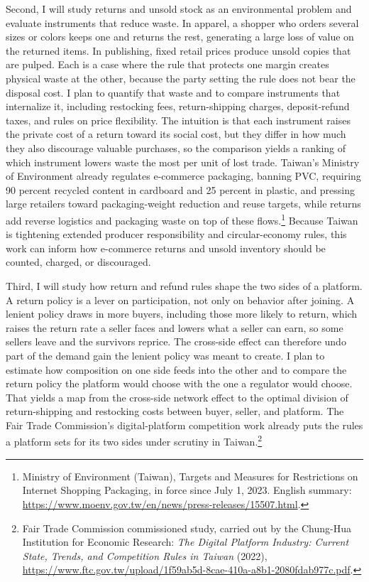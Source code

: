 \documentclass[11pt,letterpaper]{article}
\begin{document}
Second, I will study returns and unsold stock as an environmental problem and evaluate instruments that reduce waste. In apparel, a shopper who orders several sizes or colors keeps one and returns the rest, generating a large loss of value on the returned items. In publishing, fixed retail prices produce unsold copies that are pulped. Each is a case where the rule that protects one margin creates physical waste at the other, because the party setting the rule does not bear the disposal cost. I plan to quantify that waste and to compare instruments that internalize it, including restocking fees, return-shipping charges, deposit-refund taxes, and rules on price flexibility. The intuition is that each instrument raises the private cost of a return toward its social cost, but they differ in how much they also discourage valuable purchases, so the comparison yields a ranking of which instrument lowers waste the most per unit of lost trade. Taiwan's Ministry of Environment already regulates e-commerce packaging, banning PVC, requiring 90 percent recycled content in cardboard and 25 percent in plastic, and pressing large retailers toward packaging-weight reduction and reuse targets, while returns add reverse logistics and packaging waste on top of these flows.\footnote{Ministry of Environment (Taiwan), Targets and Measures for Restrictions on Internet Shopping Packaging, in force since July 1, 2023. English summary: \url{https://www.moenv.gov.tw/en/news/press-releases/15507.html}.} Because Taiwan is tightening extended producer responsibility and circular-economy rules, this work can inform how e-commerce returns and unsold inventory should be counted, charged, or discouraged.

Third, I will study how return and refund rules shape the two sides of a platform. A return policy is a lever on participation, not only on behavior after joining. A lenient policy draws in more buyers, including those more likely to return, which raises the return rate a seller faces and lowers what a seller can earn, so some sellers leave and the survivors reprice. The cross-side effect can therefore undo part of the demand gain the lenient policy was meant to create. I plan to estimate how composition on one side feeds into the other and to compare the return policy the platform would choose with the one a regulator would choose. That yields a map from the cross-side network effect to the optimal division of return-shipping and restocking costs between buyer, seller, and platform. The Fair Trade Commission's digital-platform competition work already puts the rules a platform sets for its two sides under scrutiny in Taiwan.\footnote{Fair Trade Commission commissioned study, carried out by the Chung-Hua Institution for Economic Research: \emph{The Digital Platform Industry: Current State, Trends, and Competition Rules in Taiwan} (2022), \url{https://www.ftc.gov.tw/upload/1f59ab5d-8cae-410a-a8b1-2080fdab977c.pdf}.}
\end{document}
